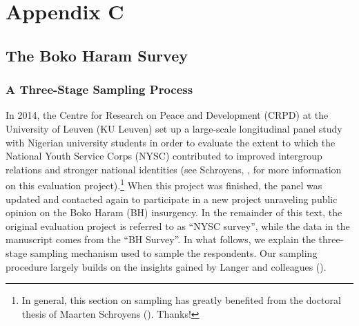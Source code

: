 
\chapter[Appendix C]{Appendix C}

\section[The Boko Haram Survey]{The Boko Haram Survey}
\label{app:C1}

\subsection{A Three-Stage Sampling Process}
In 2014, the Centre for Research on Peace and Development (CRPD) at the University of Leuven (KU Leuven) set up a large-scale longitudinal panel study with Nigerian university students in order to evaluate the extent to which the National Youth Service Corps (NYSC) contributed to improved intergroup relations and stronger national identities (see Schroyens, \citeyear{Schroyens2019}, for more information on this evaluation project).\footnote{In general, this section on sampling has greatly benefited from the doctoral thesis of Maarten Schroyens (\citeyear{Schroyens2019}). Thanks!} When this project was finished, the panel was updated and contacted again to participate in a new project unraveling public opinion on the Boko Haram (BH) insurgency. In the remainder of this text, the original evaluation project is referred to as ``NYSC survey'', while the data in the manuscript comes from the ``BH Survey''. In what follows, we explain the three-stage sampling mechanism used to sample the respondents. Our sampling procedure largely builds on the insights gained by Langer and colleagues (\citeyear{Langer2017a}).



